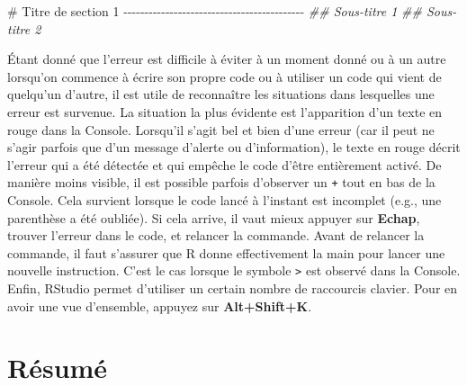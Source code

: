 \documentclass[
  letterpaper,
]{book}
\newenvironment{Shaded}{\begin{snugshade}}{\end{snugshade}}
\newcommand{\CommentTok}[1]{\textcolor[rgb]{0.37,0.37,0.37}{#1}}
\newcommand{\DocumentationTok}[1]{\textcolor[rgb]{0.37,0.37,0.37}{\textit{#1}}}
\begin{document}
\begin{Shaded}
\begin{Highlighting}[]
\CommentTok{\# Titre de section 1 {-}{-}{-}{-}{-}{-}{-}{-}{-}{-}{-}{-}{-}{-}{-}{-}{-}{-}{-}{-}{-}{-}{-}{-}{-}{-}{-}{-}{-}{-}{-}{-}{-}{-}{-}{-}{-}{-}{-}{-}{-}{-}{-}}
\DocumentationTok{\#\# Sous{-}titre 1}
\DocumentationTok{\#\# Sous{-}titre 2}
\end{Highlighting}
\end{Shaded}

Étant donné que l'erreur est difficile à éviter à un moment donné ou à
un autre lorsqu'on commence à écrire son propre code ou à utiliser un
code qui vient de quelqu'un d'autre, il est utile de reconnaître les
situations dans lesquelles une erreur est survenue. La situation la plus
évidente est l'apparition d'un texte en rouge dans la Console. Lorsqu'il
s'agit bel et bien d'une erreur (car il peut ne s'agir parfois que d'un
message d'alerte ou d'information), le texte en rouge décrit l'erreur
qui a été détectée et qui empêche le code d'être entièrement activé. De
manière moins visible, il est possible parfois d'observer un \texttt{+}
tout en bas de la Console. Cela survient lorsque le code lancé à
l'instant est incomplet (e.g., une parenthèse a été oubliée). Si cela
arrive, il vaut mieux appuyer sur \textbf{Echap}, trouver l'erreur dans
le code, et relancer la commande. Avant de relancer la commande, il faut
s'assurer que R donne effectivement la main pour lancer une nouvelle
instruction. C'est le cas lorsque le symbole \texttt{\textgreater{}} est
observé dans la Console. Enfin, RStudio permet d'utiliser un certain
nombre de raccourcis clavier. Pour en avoir une vue d'ensemble, appuyez
sur \textbf{Alt+Shift+K}.

\section{Résumé}\label{ruxe9sumuxe9}
\end{document}
